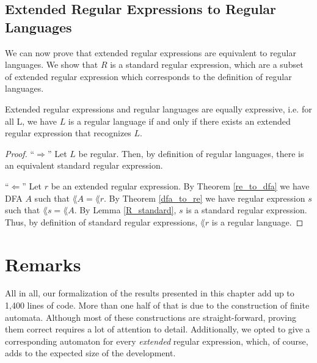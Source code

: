 \subsection{Extended Regular Expressions to Regular Languages}

We can now prove that extended regular expressions are equivalent to regular languages.
We show that $R$ is a standard regular expression, which are a subset of extended regular expression which corresponds
to the definition of regular languages.


\begin{theorem}
    \label{ext_re_to_reg_lang}
    Extended regular expressions and regular languages are equally expressive, i.e.
    for all L, we have $L$ is a regular language if and only if there exists an extended regular expression that recognizes $L$.
\end{theorem}
\begin{proof}
    ``$\Rightarrow$'' Let $L$ be regular. 
    Then, by definition of regular languages, there is an equivalent standard regular expression.

    ``$\Leftarrow$'' Let $r$ be an extended regular expression. 
    By Theorem \ref{re_to_dfa} we have DFA $A$ such that $\lang{A} = \lang{r}$.
    By Theorem \ref{dfa_to_re} we have regular expression $s$ such that $\lang{s} = \lang{A}$.
    By Lemma \ref{R_standard}, $s$ is a standard regular expression.
    Thus, by definition of standard regular expressions, $\lang{r}$ is a regular language.
\end{proof}


\section*{Remarks}

All in all, our formalization of the results presented in this chapter add up to 1,400 lines of code.
More than one half of that is due to the construction of finite automata. 
Although most of these constructions are straight-forward, proving them correct requires a lot of attention to detail.
Additionally, we opted to give a corresponding automaton for every \textit{extended} regular expression, which, 
of course, adds to the expected size of the development.

